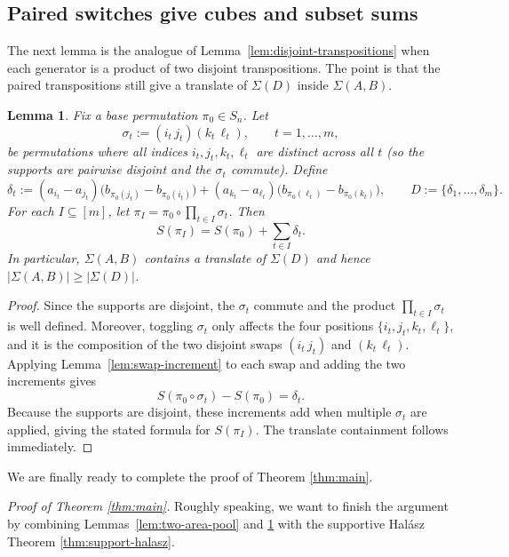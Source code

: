 \documentclass[12pt]{amsart}
\newtheorem{lemma}[theorem]{Lemma}
\theoremstyle{definition}
\theoremstyle{remark}
\newcommand{\abs}[1]{\left|#1\right|}
\begin{document}
\medskip

\subsection*{Paired switches give cubes and subset sums}
The next lemma is the analogue of Lemma~\ref{lem:disjoint-transpositions} when each generator is a
product of two disjoint transpositions. The point is that the paired transpositions still give a translate of $\Sigma(D)$ inside $\Sigma(A,B)$. 

\begin{lemma}\label{lem:paired-switches}
Fix a base permutation $\pi_0\in S_n$.  Let
\[
\sigma_t:=(i_t\,j_t)(k_t\,\ell_t),\qquad t=1,\dots,m,
\]
be permutations where all indices $i_t,j_t,k_t,\ell_t$ are distinct across all $t$ (so the supports
are pairwise disjoint and the $\sigma_t$ commute).  Define
\[
\delta_t:=(a_{i_t}-a_{j_t})\bigl(b_{\pi_0(j_t)}-b_{\pi_0(i_t)}\bigr)
      +(a_{k_t}-a_{\ell_t})\bigl(b_{\pi_0(\ell_t)}-b_{\pi_0(k_t)}\bigr),
\qquad
D:=\{\delta_1,\dots,\delta_m\}.
\]
For each $I\subseteq[m]$, let $\pi_I=\pi_0\circ\prod_{t\in I}\sigma_t$. Then
\[
S(\pi_I)=S(\pi_0)+\sum_{t\in I}\delta_t.
\]
In particular, $\Sigma(A,B)$ contains a translate of $\Sigma(D)$ and hence
$\abs{\Sigma(A,B)}\ge \abs{\Sigma(D)}$.
\end{lemma}

\begin{proof}
Since the supports are disjoint, the $\sigma_t$ commute and the product $\prod_{t\in I}\sigma_t$ is
well defined.  Moreover, toggling $\sigma_t$ only affects the four positions
$\{i_t,j_t,k_t,\ell_t\}$, and it is the composition of the two disjoint swaps $(i_t\,j_t)$ and
$(k_t\,\ell_t)$.  Applying Lemma~\ref{lem:swap-increment} to each swap and adding the two increments
gives
\[
S(\pi_0\circ\sigma_t)-S(\pi_0)=\delta_t.
\]
Because the supports are disjoint, these increments add when multiple $\sigma_t$ are applied, giving
the stated formula for $S(\pi_I)$.  The translate containment follows immediately.
\end{proof}

We are finally ready to complete the proof of Theorem \ref{thm:main}. 

\medskip
{\it{Proof of Theorem \ref{thm:main}.}} Roughly speaking, we want to finish the argument by combining Lemmas~\ref{lem:two-area-pool} and \ref{lem:paired-switches} with the supportive Hal\'asz Theorem \ref{thm:support-halasz}.
\end{document}
